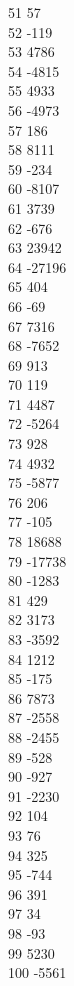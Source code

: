 { 51	57 \\
 52	-119 \\
 53	4786 \\
 54	-4815 \\
 55	4933 \\
 56	-4973 \\
 57	186 \\
 58	8111 \\
 59	-234 \\
 60	-8107 \\
 61	3739 \\
 62	-676 \\
 63	23942 \\
 64	-27196 \\
 65	404 \\
 66	-69 \\
 67	7316 \\
 68	-7652 \\
 69	913 \\
 70	119 \\
 71	4487 \\
 72	-5264 \\
 73	928 \\
 74	4932 \\
 75	-5877 \\
 76	206 \\
 77	-105 \\
 78	18688 \\
 79	-17738 \\
 80	-1283 \\
 81	429 \\
 82	3173 \\
 83	-3592 \\
 84	1212 \\
 85	-175 \\
 86	7873 \\
 87	-2558 \\
 88	-2455 \\
 89	-528 \\
 90	-927 \\
 91	-2230 \\
 92	104 \\
 93	76 \\
 94	325 \\
 95	-744 \\
 96	391 \\
 97	34 \\
 98	-93 \\
 99	5230 \\
 100	-5561 \\
}
